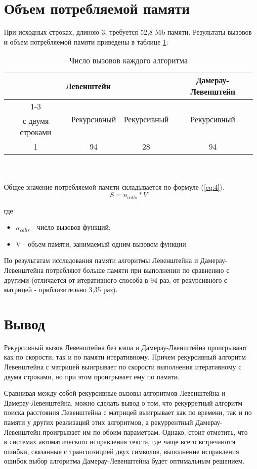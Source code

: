 \section{Объем потребляемой памяти}
При исходных строках, длиною 3, требуется 52,8 Mb памяти. Результаты вызовов и объем потребляемой памяти приведены в таблице \ref{table:ref2}:
\begin{table}[ht!]
	\centering
	\captionsetup{singlelinecheck = false, justification=raggedleft}
	\caption{Число вызовов каждого алгоритма}
	\label{table:ref2}
	\begin{tabular}{|c|c|c|c|}
		\hline
		\multicolumn{3}{|c|}{Левенштейн} & Дамерау-Левенштейн \\ \cline{1-3} 
		\hline
		\multirow{2}{*}{Итеративный} &\multirow{2}{*}{Рекурсивный} & \multirow{2}{*}{Рекурсивный} & \multirow{2}{*}{Рекурсивный} \\
		с двумя строками & без кэша  & с матрицей & \\
		\hline
		1 & 94 & 28 & 94 \\ 
		\hline
	\end{tabular}
\end{table}\\
\\
Общее значение потребляемой памяти складывается по формуле (\ref{eq:4}).
\begin{equation}
	S = n_{calls} * V
	\label{eq:4}
\end{equation}

где:
\begin{itemize}
	\item $n_{calls}$ - число вызовов функций;
	\item V - объем памяти, занимаемый одним вызовом функции.
\end{itemize}
По результатам исследования памяти алгоритмы Левенштейна и Дамерау-Левенштейна потребляют больше памяти при выполнении по сравнению с другими (отличается от итеративного способа в 94 раз, от рекурсивного с матрицей - приблизительно 3,35 раз).

\section{Вывод}
Рекурсивный вызов Левенштейна без кэша и Дамерау-Лвенштейна проигрывают как по скорости, так и по памяти итеративному. Причем рекурсивный алгоритм Левенштейна с матрицей выигрывает по скорости выполнения итеративному с двумя строками, но при этом проигрывает ему по памяти.

Сравнивая между собой рекурсивные вызовы алгоритмов Левенштейна и Дамерау-Левенштейна, можно сделать вывод о том, что рекурретный алгоритм поиска расстояния Левенштейна с матрицей выигрывает как по времени, так и по памяти у других реализаций этих алгоритмов, а рекуррентный Дамерау-Левенштейн проигрывает им по обоим параметрам. Однако, стоит отметить, что в системах автоматического исправления текста, где чаще всего встречаются ошибки, связанные с транспозицией двух символов, выполнение исправления ошибок выбор алгоритма Дамерау-Левенштейна будет оптимальным решением.\\
